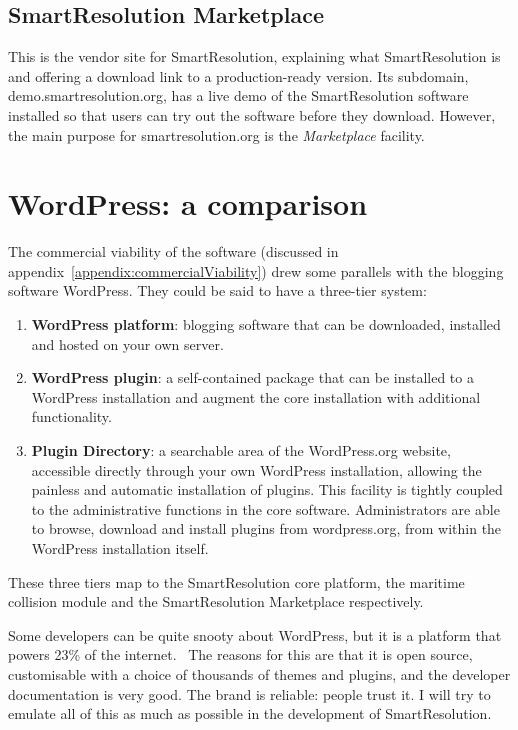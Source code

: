 \subsection{SmartResolution Marketplace}

This is the vendor site for SmartResolution, explaining what SmartResolution is and offering a download link to a production-ready version. Its subdomain, demo.smartresolution.org, has a live demo of the SmartResolution software installed so that users can try out the software before they download. However, the main purpose for smartresolution.org is the \emph{Marketplace} facility.

\section{WordPress: a comparison}

The commercial viability of the software (discussed in appendix~\ref{appendix:commercialViability}) drew some parallels with the blogging software WordPress. They could be said to have a three-tier system:

\begin{enumerate}
    \item \textbf{WordPress platform}: blogging software that can be downloaded, installed and hosted on your own server.
    
    \item \textbf{WordPress plugin}: a self-contained package that can be installed to a WordPress installation and augment the core installation with additional functionality.
    
    \item \textbf{Plugin Directory}: a searchable area of the WordPress.org website, accessible directly through your own WordPress installation, allowing the painless and automatic installation of plugins. This facility is tightly coupled to the administrative functions in the core software. Administrators are able to browse, download and install plugins from wordpress.org, from within the WordPress installation itself.
\end{enumerate}

These three tiers map to the SmartResolution core platform, the maritime collision module and the SmartResolution Marketplace respectively.

Some developers can be quite snooty about WordPress, but it is a platform that powers 23\% of the internet.~\cite{wordpressPopular} The reasons for this are that it is open source, customisable with a choice of thousands of themes and plugins, and the developer documentation is very good. The brand is reliable: people trust it. I will try to emulate all of this as much as possible in the development of SmartResolution.

